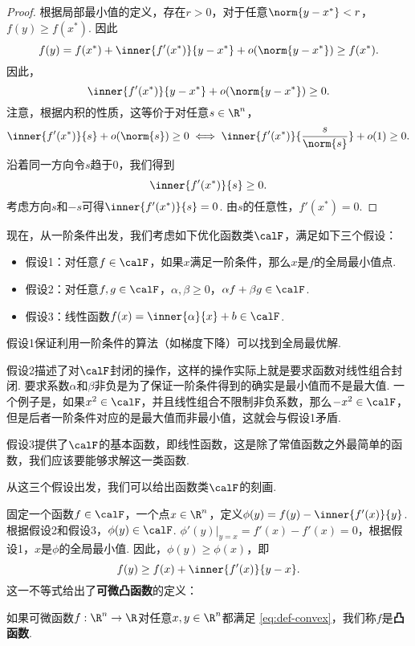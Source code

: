 \begin{proof}
根据局部最小值的定义，存在$r>0$，对于任意$\norm{y-x^*}<r$，$f(y)\geq f(x^*)$. 因此
\[f(y)=f(x^*)+\inner{f'(x^*)}{y-x^*}+o(\norm{y-x^*})\geq f(x^*).\]
因此，
\[\inner{f'(x^*)}{y-x^*}+o(\norm{y-x^*})\geq 0.\]
注意，根据内积的性质，这等价于对任意$s\in\R^n$，
\[\inner{f'(x^*)}{s}+o(\norm{s})\geq 0\iff \inner{f'(x^*)}{\frac{s}{\norm{s}}}+o(1)\geq 0.\]
沿着同一方向令$s$趋于$0$，我们得到
\[\inner{f'(x^*)}{s}\geq 0.\]
考虑方向$s$和$-s$可得$\inner{f'(x^*)}{s}=0$. 由$s$的任意性，$f'(x^*)=0$.
\end{proof}

现在，从一阶条件出发，我们考虑如下优化函数类$\calF$，满足如下三个假设：
\begin{itemize}
    \item 假设1：对任意$f\in\calF$，如果$x$满足一阶条件，那么$x$是$f$的全局最小值点.
    \item 假设2：对任意$f,g\in\calF$，$\alpha,\beta\geq 0$，$\alpha f+\beta g\in\calF$.
    \item 假设3：线性函数$f(x)=\inner{\alpha}{x}+b\in\calF$.
\end{itemize}

假设1保证利用一阶条件的算法（如梯度下降）可以找到全局最优解. 

假设2描述了对$\calF$封闭的操作，这样的操作实际上就是要求函数对线性组合封闭. 要求系数$\alpha$和$\beta$非负是为了保证一阶条件得到的确实是最小值而不是最大值. 一个例子是，如果$x^2\in\calF$，并且线性组合不限制非负系数，那么$-x^2\in\calF$，但是后者一阶条件对应的是最大值而非最小值，这就会与假设1矛盾.  

假设3提供了$\calF$的基本函数，即线性函数，这是除了常值函数之外最简单的函数，我们应该要能够求解这一类函数.

从这三个假设出发，我们可以给出函数类$\calF$的刻画. 

固定一个函数$f\in\calF$，一个点$x\in\R^n$，定义$\phi(y)=f(y)-\inner{f'(x)}{y}$. 根据假设2和假设3，$\phi(y)\in\calF$. $\phi'(y)|_{y=x}=f'(x)-f'(x)=0$，根据假设1，$x$是$\phi$的全局最小值. 因此，$\phi(y)\geq\phi(x)$，即
\begin{equation}
    f(y)\geq f(x)+\inner{f'(x)}{y-x}.\label{eq:def-convex}
\end{equation}
这一不等式给出了\textbf{可微凸函数}的定义：

\begin{definition}[（可微）凸函数]
    如果可微函数$f:\R^n\to\R$对任意$x,y\in\R^n$都满足 \eqref{eq:def-convex}，我们称$f$是\textbf{凸函数}. 
\end{definition}

